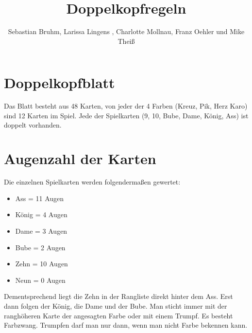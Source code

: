 \documentclass[a4paper,11pt]{article}
\begin{document}
\setcounter{loesung}{23}

\title{Doppelkopfregeln}
\author{Sebastian Bruhm, Larissa Lingens , Charlotte Mollnau, Franz Oehler und Mike Theiß}
\maketitle
\newpage
\tableofcontents
\newpage

\section{Doppelkopfblatt}
Das Blatt besteht aus 48 Karten, von jeder der 4 Farben (Kreuz, Pik, Herz Karo) sind 12 Karten im Spiel. Jede der Spielkarten (9, 10, Bube, Dame, König, Ass) ist doppelt vorhanden. 
\section{Augenzahl der Karten}
Die einzelnen Spielkarten werden folgendermaßen gewertet:
\begin{itemize}
\item
    Ass = 11 Augen
\item
    König = 4 Augen
\item
    Dame = 3 Augen
\item
    Bube = 2 Augen
\item
    Zehn = 10 Augen
\item
    Neun = 0 Augen
\end{itemize}
Dementsprechend liegt die Zehn in der Rangliste direkt hinter dem Ass. Erst dann folgen der König, die Dame und der Bube. Man sticht immer mit der ranghöheren Karte der angesagten Farbe oder mit einem Trumpf.
Es besteht Farbzwang. Trumpfen darf man nur dann, wenn man nicht Farbe bekennen kann.
\end{document}
